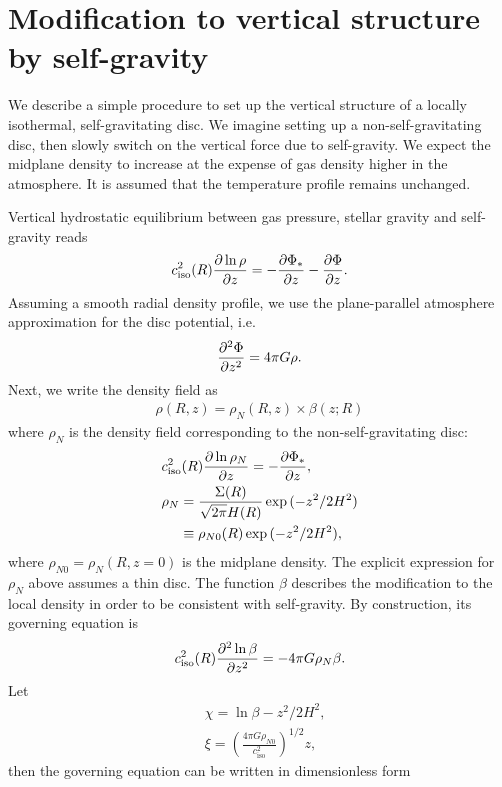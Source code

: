 \section{Modification to vertical structure by self-gravity}\label{vertsg_mod}
We describe a simple procedure to set up the vertical structure of a locally
isothermal, self-gravitating disc. We imagine setting up a non-self-gravitating disc,
then slowly switch on the vertical force due to self-gravity. We expect the midplane
density to increase at the expense of gas density higher in the atmosphere. It is assumed
that the temperature profile remains unchanged. 

Vertical hydrostatic equilibrium between
gas pressure, stellar gravity and self-gravity reads
\begin{align}
c_\mathrm{iso}^2(R)\frac{\partial\ln{\rho}}{\partial z} = -\frac{\partial\Phi_*}{\partial z} - \frac{\partial\Phi}{\partial z}. 
\end{align}
Assuming a smooth radial density profile, we use the plane-parallel atmosphere
approximation for the disc potential, i.e.
\begin{align}
\frac{\partial^2\Phi}{\partial z^2} = 4\pi G \rho. 
\end{align}
Next, we write the density field as
\begin{align}
\rho(R,z) = \rho_N(R, z) \times \beta(z; R)
\end{align}
where $\rho_N$ is the density field corresponding to the non-self-gravitating disc:
\begin{align}
&c_\mathrm{iso}^2(R)\frac{\partial\ln{\rho_N}}{\partial z} = -\frac{\partial\Phi_*}{\partial z},\\
&\rho_N = \frac{\Sigma(R)}{\sqrt{2\pi}H(R)}\exp{(-z^2/2H^2)} \notag\\
&\phantom{\rho_N}\equiv \rho_{N0}(R)\exp{(-z^2/2H^2)},
\end{align}
where $\rho_{N0}=\rho_N(R,z=0)$ is the midplane density. The explicit
expression for $\rho_N$ above assumes a thin disc. The function
$\beta$ describes the modification to the local density in order to be
consistent with self-gravity. By construction, its governing equation
is 
\begin{align}
c_\mathrm{iso}^2(R)\frac{\partial^2\ln{\beta}}{\partial z^2} = -4\pi G\rho_N\beta. 
\end{align}
Let 
\begin{align}
& \chi  = \ln\beta - z^2/2H^2 ,\\
& \xi= \left(\frac{4\pi G \rho_{N0} }{c_\mathrm{iso}^2}\right)^{1/2} z,
\end{align}
then the governing equation can be written in dimensionless form
